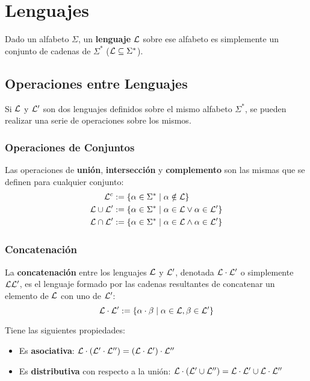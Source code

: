 \section{Lenguajes}

Dado un alfabeto $\Sigma$, un \textbf{lenguaje} $\mathcal{L}$ sobre ese alfabeto es simplemente un conjunto de cadenas de $\Sigma^*$ ($\mathcal{L} \subseteq \Sigma^*$).

\subsection{Operaciones entre Lenguajes}
\label{subsec-operaciones-lenguajes}

Si $\mathcal{L}$ y $\mathcal{L}'$ son dos lenguajes definidos sobre el mismo alfabeto $\Sigma^*$, se pueden realizar una serie de operaciones sobre los mismos.

\subsubsection{Operaciones de Conjuntos}

Las operaciones de \textbf{unión}, \textbf{intersección} y \textbf{complemento} son las mismas que se definen para cualquier conjunto:
$$
\begin{aligned}
    \mathcal{L}^c & := \{\alpha \in \Sigma^* \mid \alpha \notin \mathcal{L}\} \\
    \mathcal{L} \cup \mathcal{L}' & := \{\alpha \in \Sigma^* \mid \alpha \in \mathcal{L} \lor \alpha \in \mathcal{L}'\} \\
    \mathcal{L} \cap \mathcal{L}' & := \{\alpha \in \Sigma^* \mid \alpha \in \mathcal{L} \land \alpha \in \mathcal{L}'\} \\
\end{aligned}
$$

\subsubsection{Concatenación}

La \textbf{concatenación} entre los lenguajes $\mathcal{L}$ y $\mathcal{L}'$, denotada $\mathcal{L} \cdot \mathcal{L}'$ o simplemente $\mathcal{L}\mathcal{L}'$, es el lenguaje formado por las cadenas resultantes de concatenar un elemento de $\mathcal{L}$ con uno de $\mathcal{L}'$:
$$\mathcal{L} \cdot \mathcal{L}' := \{\alpha \cdot \beta \mid \alpha \in \mathcal{L}, \beta \in \mathcal{L}'\}$$

Tiene las siguientes propiedades:
\begin{itemize}
    \item Es \textbf{asociativa}: $\mathcal{L} \cdot (\mathcal{L}' \cdot \mathcal{L}'') = (\mathcal{L} \cdot \mathcal{L}') \cdot \mathcal{L}''$
    \item Es \textbf{distributiva} con respecto a la unión: $\mathcal{L} \cdot (\mathcal{L}' \cup \mathcal{L}'') = \mathcal{L} \cdot \mathcal{L}' \cup \mathcal{L} \cdot \mathcal{L}''$
\end{itemize}

